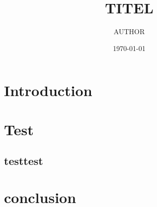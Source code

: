 \documentclass[nobib]{tufte-book}
\title{TITEL}
\author{AUTHOR}
\date{\today}
\begin{document}
\maketitle

\section{Introduction}
\section{Test}
\subsection{testtest}
\section{conclusion}
\end{document}
